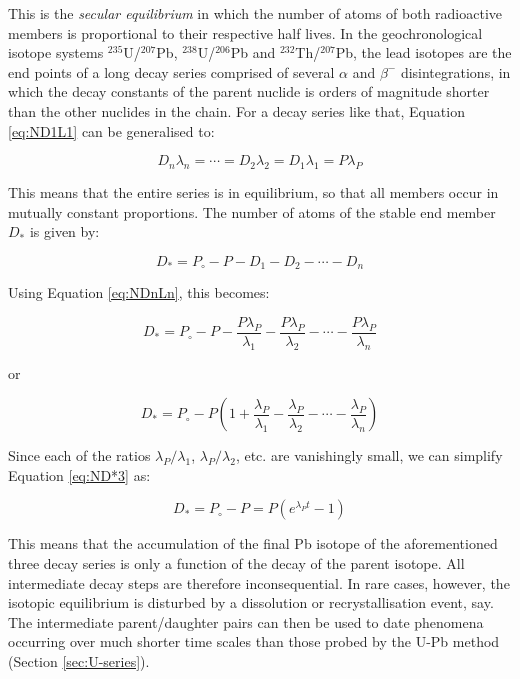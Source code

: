 \documentclass{book}
\begin{document}
This is the \emph{secular equilibrium} in which the number of atoms of
both radioactive members is proportional to their respective half
lives. In the geochronological isotope systems $^{235}$U/$^{207}$Pb,
$^{238}$U/$^{206}$Pb and $^{232}$Th/$^{207}$Pb, the lead isotopes are
the end points of a long decay series comprised of several $\alpha$
and $\beta^-$ disintegrations, in which the decay constants of the
parent nuclide is orders of magnitude shorter than the other nuclides
in the chain. For a decay series like that, Equation \ref{eq:ND1L1}
can be generalised to:

\begin{equation}
D_n \lambda_n = \cdots  = D_2 \lambda_2 = D_1 \lambda_1 = P \lambda_P
\label{eq:NDnLn}
\end{equation}

This means that the entire series is in equilibrium, so that all
members occur in mutually constant proportions. The number of atoms of
the stable end member $D_*$ is given by:

\begin{equation}
D_* = P_\circ - P - D_1 - D_2 - \cdots - D_n
\label{eq:ND*}
\end{equation}

Using Equation \ref{eq:NDnLn}, this becomes:

\begin{equation}
D_* = P_\circ - P - \frac{P \lambda_P}{\lambda_1} - 
\frac{P \lambda_P}{\lambda_2} - \cdots - \frac{P \lambda_P}{\lambda_n}
\label{eq:ND*2}
\end{equation}

or

\begin{equation}
D_* = P_\circ - P \left( 1 + \frac{\lambda_P}{\lambda_1} - 
\frac{\lambda_P}{\lambda_2} - \cdots - \frac{\lambda_P}{\lambda_n}\right)
\label{eq:ND*3}
\end{equation}

Since each of the ratios $\lambda_P/\lambda_1$, $\lambda_P/\lambda_2$,
etc.  are vanishingly small, we can simplify Equation \ref{eq:ND*3}
as:

\begin{equation}
D_* = P_\circ - P = P \left( e^{\lambda_P t} -1 \right)
\label{eq:ND*4}
\end{equation}

This means that the accumulation of the final Pb isotope of the
aforementioned three decay series is only a function of the decay of
the parent isotope.  All intermediate decay steps are therefore
inconsequential. In rare cases, however, the isotopic equilibrium is
disturbed by a dissolution or recrystallisation event, say. The
intermediate parent/daughter pairs can then be used to date phenomena
occurring over much shorter time scales than those probed by the U-Pb
method (Section \ref{sec:U-series}).
\end{document}
